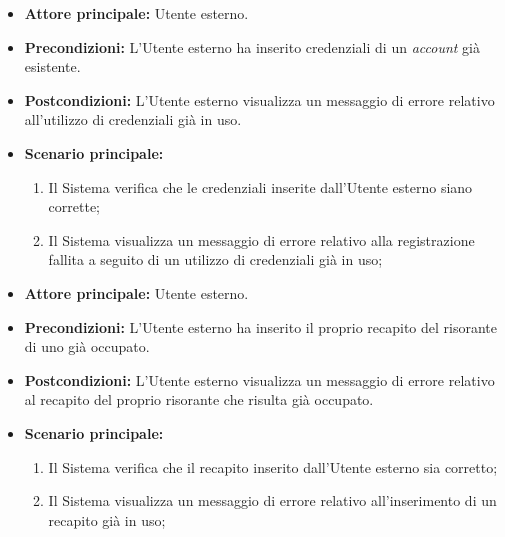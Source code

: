 \label{usecase:Errore registrazione account esistente}
\begin{itemize}

	\item \textbf{Attore principale:} Utente esterno.

	\item \textbf{Precondizioni:} L'Utente esterno ha inserito credenziali di un \textit{account} già esistente.

	\item \textbf{Postcondizioni:} L'Utente esterno visualizza un messaggio di errore relativo all'utilizzo di credenziali già in uso.

	\item \textbf{Scenario principale:}
	\begin{enumerate}
        \item Il Sistema verifica che le credenziali inserite dall'Utente esterno siano corrette;
        \item Il Sistema visualizza un messaggio di errore relativo alla registrazione fallita a seguito di un utilizzo di credenziali già in uso;
	\end{enumerate}
	
\end{itemize}

\label{usecase:Errore registrazione recapito occupato}
\begin{itemize}

	\item \textbf{Attore principale:} Utente esterno.

	\item \textbf{Precondizioni:} L'Utente esterno ha inserito il proprio recapito del risorante di uno già occupato.
	
	\item \textbf{Postcondizioni:} L'Utente esterno visualizza un messaggio di errore relativo al recapito del proprio risorante che risulta già occupato.

	\item \textbf{Scenario principale:}
	\begin{enumerate}
        \item Il Sistema verifica che il recapito inserito dall'Utente esterno sia corretto;
        \item Il Sistema visualizza un messaggio di errore relativo all'inserimento di un recapito già in uso;
	\end{enumerate}
	
\end{itemize}